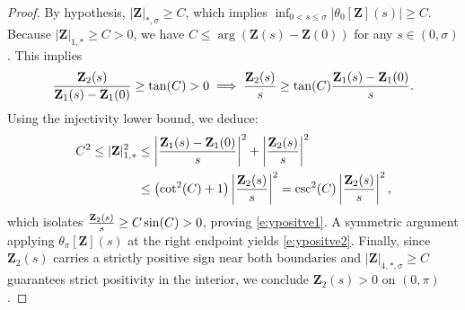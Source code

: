 \documentclass{amsart}
\newcommand{\mZ}{\mathbf{Z}}
\begin{document}
\begin{proof}
By hypothesis, $|\mZ|_{*,\sigma} \geq C$, which implies $\inf_{0 < s \leq \sigma} |\theta_0[\mZ](s)| \geq C$. Because $|\mZ|_{1,*} \geq C > 0$, we have $C \leq \arg(\mZ(s) - \mZ(0))$ for any $s \in (0,\sigma)$. This implies
\[
{\mZ_2(s) \over \mZ_1(s) - \mZ_1(0)} \geq \tan(C) > 0
\implies
{\mZ_2(s)\over s} \geq \tan(C){\mZ_1(s) - \mZ_1(0)\over s}.
\]
Using the injectivity lower bound, we deduce:
\begin{align*}
C^2 \leq | \mZ|^2_{1,*}
& \leq  \left|{\mZ_1(s) - \mZ_1(0) \over s}\right|^2 + \left|{\mZ_2 (s)\over s}\right|^2\\
& \leq \left( \cot^2(C) + 1\right) \left| {\mZ_2(s)  \over s} \right|^2 = \csc^2(C) \left| {\mZ_2(s)  \over s} \right|^2,
\end{align*}
which isolates ${\mZ_2(s) \over s} \ge C \sin(C) > 0$, proving \eqref{e:ypositve1}. A symmetric argument applying $\theta_\pi[\mZ](s)$ at the right endpoint yields \eqref{e:ypositve2}. Finally, since $\mZ_2(s)$ carries a strictly positive sign near both boundaries and $|\mZ|_{4,*,\sigma} \geq C$ guarantees strict positivity in the interior, we conclude $\mZ_2(s) > 0$ on $(0, \pi)$.
\end{proof}
\end{document}
